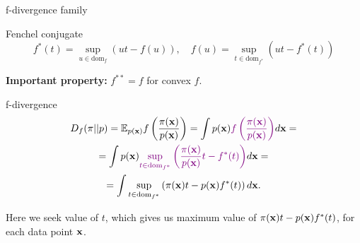 \begin{frame}{f-divergence family}
	\vspace{-0.2cm}
	\begin{block}{Fenchel conjugate}
		\vspace{-0.7cm}
		\[
		f^*(t) = \sup_{u \in \text{dom}_f} \left( ut - f(u) \right), \quad f(u) = \sup_{t \in \text{dom}_{f^*}} \left( ut - f^*(t) \right)
		\]
		\vspace{-0.5cm}
	\end{block}
	\textbf{Important property:} $ f^{**} = f$ for convex $f$.
	\begin{block}{f-divergence}
		\vspace{-0.8cm}
		\begin{multline*}
			D_f(\pi || p) = \mathbb{E}_{p(\mathbf{x})}  f\left( \frac{\pi(\mathbf{x})}{p(\mathbf{x})} \right)  = \int p(\mathbf{x}) {\color{violet}f\left( \frac{\pi(\mathbf{x})}{p(\mathbf{x})} \right) } d \mathbf{x} = \\ = \int p(\mathbf{x}) {\color{violet} \sup_{t \in \text{dom}_{f^*}} \left( \frac{\pi(\mathbf{x})}{p(\mathbf{x})} t - f^*(t) \right)} d \mathbf{x} = \\ 
			= \int \sup_{t \in \text{dom}_{f^*}} \left( \pi(\mathbf{x})t - p(\mathbf{x}) f^*(t) \right) d \mathbf{x} .
		\end{multline*}
		\vspace{-0.6cm}
	\end{block}
	Here we seek value of $t$, which gives us maximum value of $ \pi(\mathbf{x})t - p(\mathbf{x}) f^*(t)$, for each data point $\mathbf{x}$.
\end{frame}
